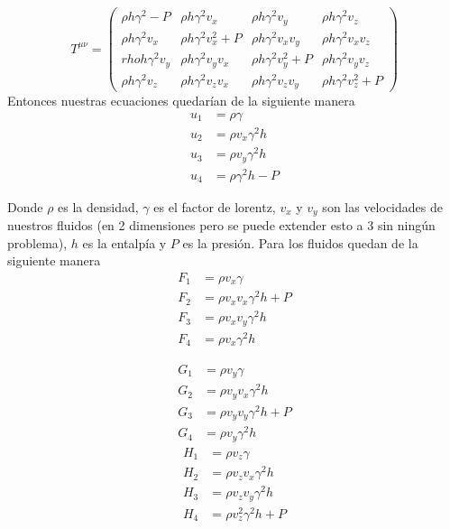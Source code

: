 \documentclass[12pt,a4paper]{book}
\begin{document}
\begin{equation}
T^{\mu \nu} =
\begin{pmatrix}
\rho h \gamma^2-P & \rho h \gamma^2 v_{x}  & \rho h \gamma^2 v_{y} & \rho h \gamma^2 v_{z} \\

\rho h \gamma^2 v_{x} & \rho h \gamma^2 v_{x}^{2}+P & \rho h \gamma^2 v_{x}v_{y} &  \rho h \gamma^2 v_{x}v_{z} \\

rho h \gamma^2 v_{y} & \rho h \gamma^2 v_{y}v_{x} & \rho h \gamma^2 v_{y}^{2}+P & \rho h \gamma^2 v_{y}v_{z}\\

\rho h \gamma^2 v_{z} & \rho h \gamma^2 v_{z}v_{x} & \rho h \gamma^2 v_{z}v_{y} & \rho h \gamma^2 v_{z}^2 + P
   
\end{pmatrix}
\end{equation}
Entonces nuestras ecuaciones quedarían de la siguiente manera
\begin{align}
u_{1}& = \rho \gamma \\ 
u_{2}& = \rho v_{x} \gamma^{2} h \\ 
u_{3}& = \rho v_{y} \gamma^{2} h \\ 
u_{4}& = \rho \gamma^{2} h - P 
\end{align}

Donde $\rho$ es la densidad, $\gamma$ es el factor de lorentz, $v_{x}$ y $v_{y}$ son las velocidades de nuestros fluidos (en 2 dimensiones pero se puede extender esto a 3 sin ningún problema), $h$ es la entalpía  y $P$ es la presión. Para los fluidos quedan de la siguiente manera
\begin{align}
F_{1}& = \rho v_{x} \gamma \\ 
F_{2}& = \rho v_{x} v_{x} \gamma^{2} h + P\\ 
F_{3}& = \rho v_{x} v_{y} \gamma^{2} h \\ 
F_{4}& = \rho v_{x} \gamma^{2} h 
\end{align}

\begin{align}
G_{1}& = \rho v_{y} \gamma \\ 
G_{2}& = \rho v_{y} v_{x} \gamma^{2} h \\ 
G_{3}& = \rho v_{y} v_{y} \gamma^{2} h + P\\ 
G_{4}& = \rho v_{y} \gamma^{2} h
\end{align}
\begin{align}
H_{1}& = \rho v_{z} \gamma \\ 
H_{2}& = \rho v_{z} v_{x} \gamma^{2} h \\ 
H_{3}& = \rho v_{z} v_{y} \gamma^{2} h \\ 
H_{4}& = \rho v_{z}^{2} \gamma^{2} h + P
\end{align}
\end{document}
